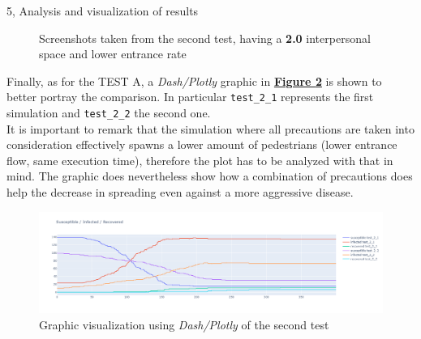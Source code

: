 \documentclass[10pt,a4paper]{article}
\begin{document}
\begin{task}{5, Analysis and visualization of results}
\begin{figure}[H]
    \centering
    \hfill
    \hfill
    \caption{Screenshots taken from the second test, having a \textbf{2.0} interpersonal space and lower entrance rate}
    \label{fig:5.3-2.2}
\end{figure}

Finally, as for the TEST A, a \textit{Dash/Plotly} graphic in \textbf{\hyperref[fig:second-test-dash]{Figure \ref{fig:second-test-dash}}} is shown to better portray the comparison. In particular \texttt{test\_2\_1} represents the first simulation and \texttt{test\_2\_2} the second one.\\
It is important to remark that the simulation where all precautions are taken into consideration effectively spawns a lower amount of pedestrians (lower entrance flow, same execution time), therefore the plot has to be analyzed with that in mind. The graphic does nevertheless show how a combination of precautions does help the decrease in spreading even against a more aggressive disease.
\begin{figure}[H]
    \centering
    \includegraphics[scale=0.3]{images/5.3/second_test_dash.png}
    \caption{Graphic visualization using \textit{Dash/Plotly} of the second test}
    \label{fig:second-test-dash}
\end{figure}


\end{task}
\end{document}
